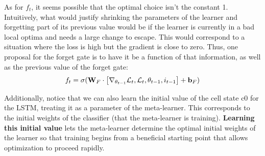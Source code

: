 \documentclass{article}
\newtheorem{definition}{Definition}
\begin{document}
As for $f_t$, it seems possible that the optimal choice isn’t the constant 1. Intuitively, what would justify shrinking the parameters of the learner and forgetting part of its previous value would be if the learner is currently in a bad local optima and needs a large change to escape. This would correspond to a situation where the loss is high but the gradient is close to zero. Thus, one proposal for the forget gate is to have it be a function of that information, as well as the previous value of the forget gate:
\[
f_t=\sigma(\mathbf{W}_F\cdot\left[\nabla_{\theta_{t-1}}\mathcal{L}_t,\mathcal{L}_t,\theta_{t-1},i_{t-1} \right]+{\bf b}_F)
\]

Additionally, notice that we can also learn the initial value of the cell state c0 for the LSTM, treating it as a parameter of the meta-learner. This corresponds to the initial weights of the classifier (that the meta-learner is training). \textbf{Learning this initial value} lets the meta-learner determine the optimal initial weights of the learner so that training begins from a beneficial starting point that allows optimization to proceed rapidly.







\end{document}
